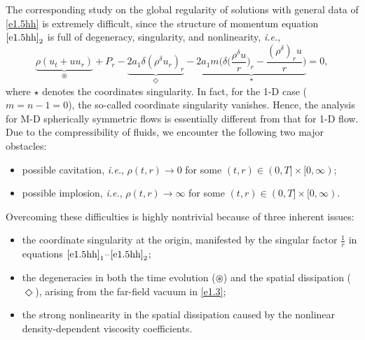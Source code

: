 \documentclass[11pt,reqno]{amsart}
\numberwithin{rk}{section}
\numberwithin{prop}{section}
\numberwithin{mydef}{section}
\numberwithin{lem}{section}
\numberwithin{equation}{section}
\numberwithin{thm}{section}
\begin{document}
The corresponding study on the global regularity of solutions with general data  of \eqref{e1.5hh} is extremely difficult, since the structure of momentum equation $\eqref{e1.5hh}_2$ is full of degeneracy, singularity, and nonlinearity, \textit{i.e.},
\begin{equation}\label{cosingu}
\displaystyle
\underbrace{\rho (u_t+uu_r)}_{\circledast}+P_r-\underbrace{2a_1\delta(\rho^\delta u_r)_r}_{\Diamond}-\underbrace{2 a_1 m \Big(\delta \big(\frac{\rho^\delta u}{r} \big)_r-\frac{ (\rho^\delta)_r u}{r}\Big)}_{\star} =0,
\end{equation}
where $\star$ denotes the  coordinates singularity.
In fact, for the 1-D case ($m=n-1=0$), 
the so-called coordinate singularity vanishes. 
Hence, the analysis for M-D spherically symmetric flows is essentially different from that for 1-D flow.
Due to the compressibility of fluids, 
we encounter the following  two major obstacles:
\begin{itemize}
\item possible cavitation, {\it i.e.}, $\rho(t,r)\to 0$ for some $(t,r)\in (0,T]\times [0,\infty)$;
\vspace{3pt}
\item possible implosion, {\it i.e.}, $\rho(t,r)\to \infty$ for some $(t,r)\in (0,T]\times [0,\infty)$.
\end{itemize}
Overcoming these difficulties is highly nontrivial  because of three inherent issues:
\begin{itemize}
\item the coordinate singularity at the origin, manifested by the singular factor $\tfrac{1}{r}$ in equations $\eqref{e1.5hh}_1$--$\eqref{e1.5hh}_2$;

\vspace{3pt}
\item the degeneracies in both the time evolution ($\circledast$) and the spatial dissipation ($\Diamond$), arising  from the far-field vacuum 
in \eqref{e1.3};


\vspace{3pt}
\item the strong nonlinearity in the spatial dissipation caused by the nonlinear density-dependent viscosity coefficients.
\end{itemize}
\end{document}
